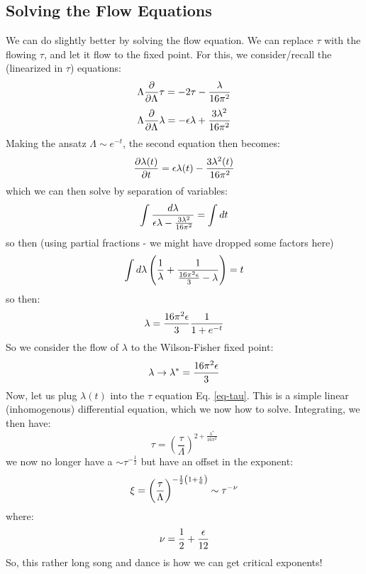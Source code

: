 \subsection{Solving the Flow Equations}
We can do slightly better by solving the flow equation. We can replace $\tau$ with the flowing $\tau$, and let it flow to the fixed point. For this, we consider/recall the (linearized in $\tau$) equations:
\begin{equation}\label{eq-tau}
    \Lambda\frac{\partial }{\partial \Lambda}\tau = -2\tau - \frac{\lambda}{16\pi^2}
\end{equation}
\begin{equation}
    \Lambda\frac{\partial }{\partial \Lambda}\lambda = -\epsilon\lambda + \frac{3\lambda^2}{16\pi^2}
\end{equation}
Making the ansatz $\Lambda \sim e^{-t}$, the second equation then becomes:
\begin{equation}
    \frac{\partial \lambda(t)}{\partial t} = \epsilon\lambda(t) - \frac{3\lambda^2(t)}{16\pi^2}
\end{equation}
which we can then solve by separation of variables:
\begin{equation}
    \int \frac{d\lambda}{\epsilon\lambda - \frac{3\lambda^2}{16\pi^2}}= \int dt
\end{equation}
so then (using partial fractions - we might have dropped some factors here)
\begin{equation}
    \int d\lambda\left(\frac{1}{\lambda} + \frac{1}{\frac{16\pi^2\epsilon}{3} - \lambda}\right) = t
\end{equation}
so then:
\begin{equation}
    \lambda = \frac{16\pi^2\epsilon}{3}\frac{1}{1 + e^{-t}}
\end{equation}
So we consider the flow of $\lambda$ to the Wilson-Fisher fixed point:
\begin{equation}
    \lambda \to \lambda^* = \frac{16\pi^2\epsilon}{3}
\end{equation}
Now, let us plug $\lambda(t)$ into the $\tau$ equation Eq. \eqref{eq-tau}. This is a simple linear (inhomogenous) differential equation, which we now how to solve. Integrating, we then have:
\begin{equation}
    \tau = \left(\frac{\tau}{\Lambda}\right)^{2 + \frac{\lambda^*}{16\pi^2}}
\end{equation}
we now no longer have a $\sim \tau^{-\frac{1}{2}}$ but have an offset in the exponent:
\begin{equation}
    \xi = \left(\frac{\tau}{\Lambda}\right)^{-\frac{1}{2}\left(1 + \frac{\epsilon}{6}\right)} \sim \tau^{-\nu}
\end{equation}
where:
\begin{equation}
    \nu = \frac{1}{2} + \frac{\epsilon}{12}
\end{equation}
So, this rather long song and dance is how we can get critical exponents!

